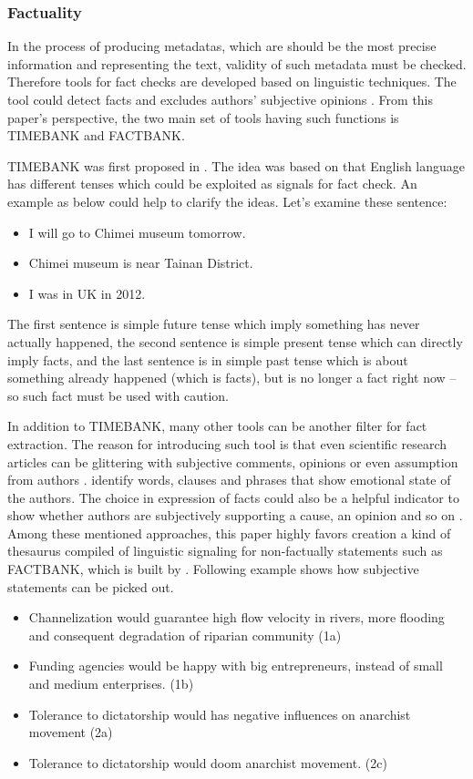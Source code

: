 \subsubsection*{Factuality}
In the process of producing metadatas, which are should be the most precise information and representing the text, validity of such metadata must be checked. Therefore tools for fact checks are developed based on linguistic techniques.  The tool could detect facts and excludes authors' subjective opinions \cite{Agerri2014}. From this paper's perspective, the two main set of tools having such functions is TIMEBANK and FACTBANK.

TIMEBANK was first proposed in \cite{Pustejovsky2003}. The idea was based on that English language has different tenses which could be exploited as signals for fact check. An example as below could help to clarify the ideas. Let's examine these sentence:

\begin{itemize}
	\item I will go to Chimei museum tomorrow.
	\item Chimei museum is near Tainan District.
	\item I was in UK in 2012.
\end{itemize}

The first sentence is simple future tense which imply something has never actually happened, the second sentence is simple present tense which can directly imply facts, and the last sentence is in simple past tense which is about something already happened (which is facts), but is no longer a fact right now -- so such fact must be used with caution. 

In addition to TIMEBANK, many other tools can be another filter for fact extraction. The reason for introducing such tool is that even scientific research articles can be glittering with subjective comments, opinions or even assumption from authors \cite{Schultze2000}. \cite{Dave2003} identify words, clauses and phrases that show emotional state of the authors. The choice in expression of facts could also be a helpful indicator to show whether authors are subjectively supporting a cause, an opinion and so on \cite{Wiebe2005}. Among these mentioned approaches, this paper highly favors creation a kind of thesaurus compiled of linguistic signaling for non-factually statements such as FACTBANK, which is built by \cite{Sauri2009}. Following example shows how subjective statements can be picked out.

\begin{itemize}
	\item Channelization would guarantee high flow velocity in rivers, more flooding and consequent degradation of riparian community (1a)
	\item Funding agencies would be happy with big entrepreneurs, instead of small and medium enterprises. (1b)
	\item Tolerance to dictatorship would has negative influences on anarchist movement (2a)
	\item Tolerance to dictatorship would doom anarchist movement. (2c)
\end{itemize}


